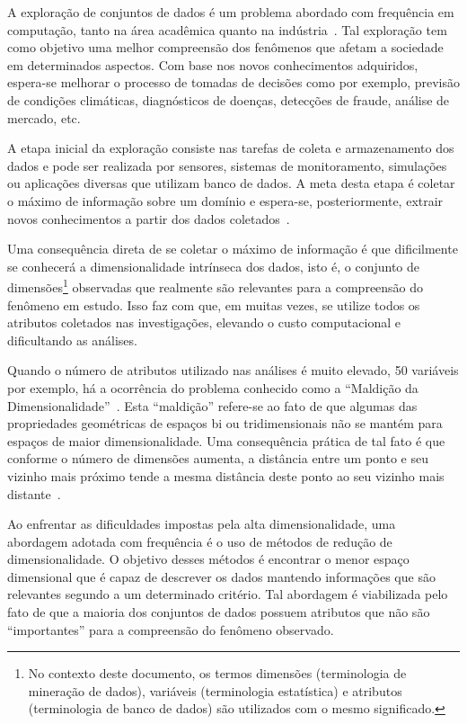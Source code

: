 
A exploração de conjuntos de dados é um problema abordado com frequência em computação, tanto na área acadêmica quanto na indústria~\cite{Ngai2009,Harding2006}. Tal exploração tem como objetivo uma melhor compreensão dos fenômenos que afetam a sociedade em determinados aspectos. Com base nos novos conhecimentos adquiridos, espera-se melhorar o processo de tomadas de decisões como por exemplo, previsão de condições climáticas, diagnósticos de doenças, detecções de fraude, análise de mercado, etc.

A etapa inicial da exploração consiste nas tarefas de coleta e armazenamento dos dados e pode ser realizada por sensores, sistemas de monitoramento, simulações ou aplicações diversas que utilizam banco de dados. A meta desta etapa é coletar o máximo de informação sobre um domínio e espera-se, posteriormente, extrair novos conhecimentos a partir dos dados coletados~\cite{Keim2002}. 

Uma consequência direta de se coletar o máximo de informação é que dificilmente se conhecerá a dimensionalidade intrínseca dos dados, isto é, o conjunto de dimensões\footnote{No contexto deste documento, os termos dimensões (terminologia de mineração de dados), variáveis (terminologia estatística) e atributos (terminologia de banco de dados) são utilizados com o mesmo significado.} observadas que realmente são relevantes para a compreensão do fenômeno em estudo. Isso faz com que, em muitas vezes, se utilize todos os atributos coletados nas investigações, elevando o custo computacional e dificultando as análises. 

Quando o número de atributos utilizado nas análises é muito elevado, 50 variáveis por exemplo, há a ocorrência do problema conhecido como a  ``Maldição da Dimensionalidade''~\cite{Beyer1999}. Esta ``maldição'' refere-se ao fato de que algumas das propriedades geométricas de espaços bi ou tridimensionais não se mantém para espaços de maior dimensionalidade. Uma consequência prática de tal fato é que conforme o número de  dimensões aumenta, a distância entre um ponto e seu vizinho mais próximo tende a mesma distância deste ponto ao seu vizinho mais distante~\citet{Beyer1999}.

Ao enfrentar as dificuldades impostas pela alta dimensionalidade, uma abordagem adotada com frequência é o uso de métodos de redução de dimensionalidade. O objetivo desses métodos é encontrar o menor espaço dimensional que é capaz de descrever os dados mantendo informações que são relevantes segundo a um determinado critério. Tal abordagem é  viabilizada pelo fato de que a maioria dos conjuntos de dados possuem atributos que não são ``importantes'' para a compreensão do fenômeno observado.


